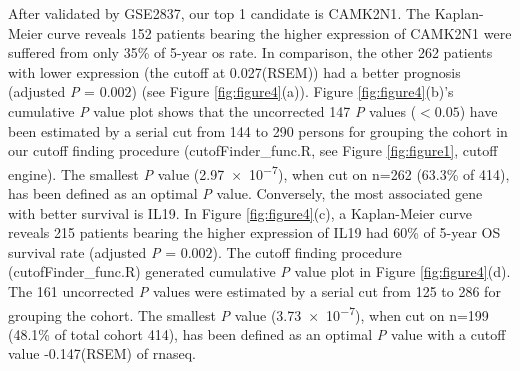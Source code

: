 \documentclass[jpm,article,submit,moreauthors,pdftex]{Definitions/mdpi}
\begin{document}
\clearpage


After validated by GSE2837, our top 1 candidate is \acrfull{CAMK2N1}. The Kaplan-Meier curve reveals 152 patients bearing the higher expression of \acrshort{CAMK2N1} were suffered from only 35\% of 5-year \acrshort{os} rate. In comparison, the other 262 patients with lower expression (the cutoff at 0.027(RSEM)) had a better prognosis (adjusted \textit{P} = $0.002$) (see Figure \ref{fig:figure4}(a)).
Figure \ref{fig:figure4}(b)'s cumulative \textit{P} value plot shows that the uncorrected 147 \textit{P} values ($< 0.05$) have been estimated by a serial cut from 144 to 290 persons for grouping the cohort in our cutoff finding procedure (cutofFinder\_func.R, see Figure \ref{fig:figure1}, cutoff engine). The smallest \textit{P} value (\num{2.97e-7}), when cut on n=262 (63.3\% of 414), has been defined as an optimal \textit{P} value.
Conversely, the most associated gene with better survival is \acrfull{IL19}. In Figure \ref{fig:figure4}(c), a Kaplan-Meier curve reveals 215 patients bearing the higher expression of \acrshort{IL19} had 60\% of 5-year OS survival rate (adjusted \textit{P} = $0.002$). The cutoff finding procedure (cutofFinder\_func.R) generated cumulative \textit{P} value plot in Figure \ref{fig:figure4}(d). The 161 uncorrected \textit{P} values were estimated by a serial cut from 125 to 286 for grouping the cohort. The smallest \textit{P} value (\num{3.73e-7}), when cut on n=199 (48.1\% of total cohort 414), has been defined as an optimal \textit{P} value with a cutoff value -0.147(RSEM) of \acrshort{rnaseq}.


\end{document}
